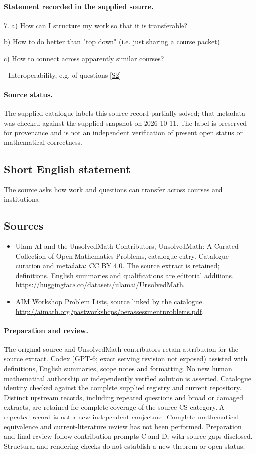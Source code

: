 \documentclass[11pt]{article}
\begin{document}
\paragraph{Statement recorded in the supplied source.}
7. a) How can I structure my work so that it is transferable?

b) How to do better than "top down" (i.e. just sharing a course packet)

c) How to connect across apparently similar courses?

- Interoperability, e.g. of questions \href{http://aimath.org/pastworkshops/oerassessmentproblems.pdf}{[S2]}
\paragraph{Source status.}
The supplied catalogue labels this source record partially solved; that metadata was checked against the supplied snapshot on 2026-10-11. The label is preserved for provenance and is not an independent verification of present open status or mathematical correctness.
\subsection{Short English statement}
The source asks how work and questions can transfer across courses and institutions.
\subsection{Sources}
\begin{itemize}
\item[S1] Ulam AI and the UnsolvedMath Contributors, UnsolvedMath: A Curated Collection of Open Mathematics Problems, catalogue entry. Catalogue curation and metadata: CC BY 4.0. The source extract is retained; definitions, English summaries and qualifications are editorial additions.
\url{https://huggingface.co/datasets/ulamai/UnsolvedMath}.
\item[S2] AIM Workshop Problem Lists, source linked by the catalogue.
\url{http://aimath.org/pastworkshops/oerassessmentproblems.pdf}.
\end{itemize}
\paragraph{Preparation and review.}
The original source and UnsolvedMath contributors retain attribution for the source extract. Codex (GPT-6; exact serving revision not exposed) assisted with definitions, English summaries, scope notes and formatting. No new human mathematical authorship or independently verified solution is asserted. Catalogue identity checked against the complete supplied registry and current repository. Distinct upstream records, including repeated questions and broad or damaged extracts, are retained for complete coverage of the source CS category. A repeated record is not a new independent conjecture. Complete mathematical-equivalence and current-literature review has not been performed. Preparation and final review follow contribution prompts C and D, with source gaps disclosed. Structural and rendering checks do not establish a new theorem or open status.
\label{end:statement}
\end{document}
